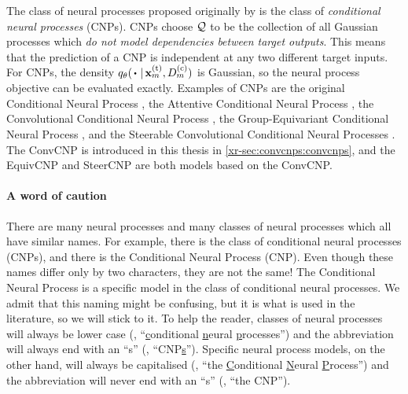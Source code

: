 \documentclass[12pt, twoside]{report}
\newcommand{\xrprefix}[1]{xr-#1}
\begin{document}
The class of neural processes proposed originally by \textcite{Garnelo:2018:Conditional_Neural_Processes} is the class of \emph{conditional neural processes} (CNPs).
CNPs choose $\mathcal{Q}$ to be the collection of all Gaussian processes which \emph{do not model dependencies between target outputs}.
This means that the prediction of a CNP is independent at any two different target inputs.
%
For CNPs, the density $q_\theta(\vardot \cond \vx\us{(t)}_m, D\us{(c)}_m)$ is Gaussian, so the neural process objective can be evaluated exactly.
Examples of CNPs are the original Conditional Neural Process \parencite[CNP;][]{Garnelo:2018:Conditional_Neural_Processes}, the Attentive Conditional Neural Process \parencite[ACNP;][]{Kim:2019:Attentive_Neural_Processes}, the Convolutional Conditional Neural Process \parencite[ConvCNP; \cref{\xrprefix{sec:convcnps:convcnps}};][]{Gordon:2020:Convolutional_Conditional_Neural_Processes}, the Group-Equivariant Conditional Neural Process \parencite[EquivCNP;][]{Kawano:2021:Group_Equivariant_Conditional_Neural_processes}, and the Steerable Convolutional Conditional Neural Processes \parencite[SteerCNP;][]{Holderrieth:2021:Equivariant_Learning_of_Stochastic_Fields}.
The ConvCNP is introduced in this thesis in \cref{\xrprefix{sec:convcnps:convcnps}},
and the EquivCNP and SteerCNP are both models based on the ConvCNP.

\paragraph{A word of caution}
There are many neural processes and many classes of neural processes which all have similar names.
For example, there is the class of conditional neural processes (CNPs), and there is the Conditional Neural Process (CNP).
Even though these names differ only by two characters, they are not the same!
The Conditional Neural Process is a specific model in the class of conditional neural processes.
We admit that this naming might be confusing, but it is what is used in the literature, so we will stick to it.
To help the reader, classes of neural processes will always be lower case (\eg, ``\underline{c}onditional \underline{n}eural \underline{p}rocesses'') and the abbreviation will always end with an ``s'' (\eg, ``CNP\underline{s}'').
Specific neural process models, on the other hand, will always be capitalised (\eg, ``the \underline{C}onditional \underline{N}eural \underline{P}rocess'') and the abbreviation will never end with an ``s'' (\eg, ``the CNP'').
\end{document}
